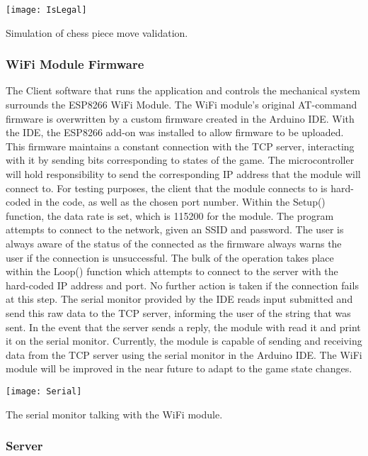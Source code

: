 \documentclass{article}
\begin{document}
\centerline{\texttt{[image: IsLegal]}}

\begin{center}
Simulation of chess piece move validation.
\end{center}

\subsubsection*{WiFi Module Firmware}
\indent

The Client software that runs the application and controls the mechanical system surrounds the ESP8266 WiFi Module. The WiFi module's original AT-command firmware is overwritten by a custom firmware created in the Arduino IDE. With the IDE, the ESP8266 add-on was installed to allow firmware to be uploaded. This firmware maintains a constant connection with the TCP server, interacting with it by sending bits corresponding to states of the game. The microcontroller will hold responsibility to send the corresponding IP address that the module will connect to. For testing purposes, the client that the module connects to is hard-coded in the code, as well as the chosen port number. Within the Setup() function, the data rate is set, which is 115200 for the module. The program attempts to connect to the network, given an SSID and password. The user is always aware of the status of the connected as the firmware always warns the user if the connection is unsuccessful. The bulk of the operation takes place within the Loop() function which attempts to connect to the server with the hard-coded IP address and port. No further action is taken if the connection fails at this step. The serial monitor provided by the IDE reads input submitted and send this raw data to the TCP server, informing the user of the string that was sent. In the event that the server sends a reply, the module with read it and print it on the serial monitor. Currently, the module is capable of sending and receiving data from the TCP server using the serial monitor in the Arduino IDE. The WiFi module will be improved in the near future to adapt to the game state changes.

\centerline{\texttt{[image: Serial]}}

\begin{center}
The serial monitor talking with the WiFi module.
\end{center}

\subsubsection*{Server}
\indent
\end{document}
